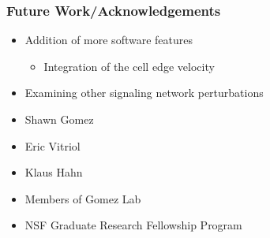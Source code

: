 \documentclass{beamer}
\begin{document}

\begin{frame}
	\frametitle{Future Work/Acknowledgements}
	\begin{itemize}
	\item Addition of more software features
		\begin{itemize}
		\item Integration of the cell edge velocity
		\end{itemize}
	\item Examining other signaling network perturbations
	\end{itemize}
	
	\begin{itemize}
	\item Shawn Gomez
	\item Eric Vitriol 
	\item Klaus Hahn
	\item Members of Gomez Lab
	\item NSF Graduate Research Fellowship Program
	\end{itemize}	
\end{frame}
\end{document}
